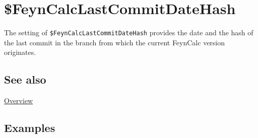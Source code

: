 \documentclass[../FeynCalcManual.tex]{subfiles}
\begin{document}
\begin{Shaded}
\begin{Highlighting}[]
 
\end{Highlighting}
\end{Shaded}

\hypertarget{dollarfeyncalclastcommitdatehash}{
\section{\$FeynCalcLastCommitDateHash}\label{dollarfeyncalclastcommitdatehash}}

The setting of \texttt{\$FeynCalcLastCommitDateHash} provides the date
and the hash of the last commit in the branch from which the current
FeynCalc version originates.

\subsection{See also}

\hyperlink{toc}{Overview}

\subsection{Examples}
\end{document}

